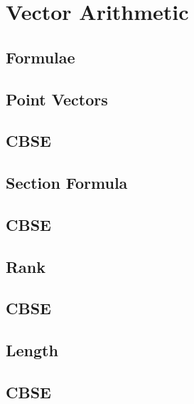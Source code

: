 \documentclass[journal]{IEEEtran}
\begin{document}
\newpage


\tableofcontents

\newpage
\onecolumn


\renewcommand{\thetable}{\theenumi}


\section{Vector Arithmetic}
\subsection{Formulae}

\subsection{Point Vectors}

\subsection{CBSE}

%
\subsection{Section Formula}

\subsection{CBSE}

\subsection{Rank}

\subsection{CBSE}

\subsection{Length}

\subsection{CBSE}

\end{document}
